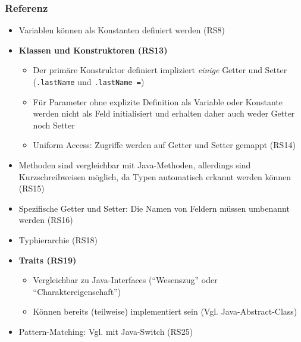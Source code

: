 \subsubsection{Referenz}
\begin{itemize}
	\item Variablen können als Konstanten definiert werden (RS8)
	\item \textbf{Klassen und Konstruktoren (RS13)}
	\begin{itemize}
		\item Der primäre Konstruktor definiert impliziert \textit{einige} Getter und Setter (\texttt{.lastName} und \texttt{.lastName =})
		\item Für Parameter ohne explizite Definition als Variable oder Konstante werden nicht als Feld initialisiert und erhalten daher auch weder Getter noch Setter
		\item Uniform Access: Zugriffe werden auf Getter und Setter gemappt (RS14)
	\end{itemize}
	\item Methoden sind vergleichbar mit Java-Methoden, allerdings sind Kurzschreibweisen möglich, da Typen automatisch erkannt werden können (RS15)
	\item Spezifische Getter und Setter: Die Namen von Feldern müssen umbenannt werden (RS16)
	\item Typhierarchie (RS18)
	\item \textbf{Traits (RS19)}
	\begin{itemize}
		\item Vergleichbar zu Java-Interfaces ("`Wesenszug"' oder "`Charaktereigenschaft"')
		\item Können bereits (teilweise) implementiert sein (Vgl. Java-Abstract-Class)
	\end{itemize}
	\item Pattern-Matching: Vgl. mit Java-Switch (RS25)
\end{itemize}

